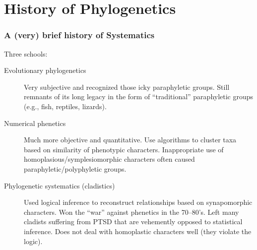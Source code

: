 \section{History of Phylogenetics}
        
\begin{frame}
    \frametitle{A (very) brief history of Systematics} 
    Three schools:
    \begin{description}
        \item[Evolutionary phylogenetics] Very subjective and recognized those
            icky paraphyletic groups. Still remnants of its long legacy in the
            form of ``traditional'' paraphyletic groups (e.g., fish, reptiles,
            lizards).
        \item[Numerical phenetics] Much more objective and quantitative.  Use
            algorithms to cluster taxa based on similarity of phenotypic
            characters. Inappropriate use of homoplasious/symplesiomorphic
            characters often caused paraphyletic/polyphyletic groups.
        \item[Phylogenetic systematics (cladistics)]
            Used logical inference to reconstruct relationships based on
            synapomorphic characters. Won the ``war'' against phenetics in the
            70--80's. Left many cladists suffering from PTSD that are
            vehemently opposed to statistical inference.
            Does not deal with homoplastic characters well (they violate the
            logic).
    



\end{description}
\end{frame}

